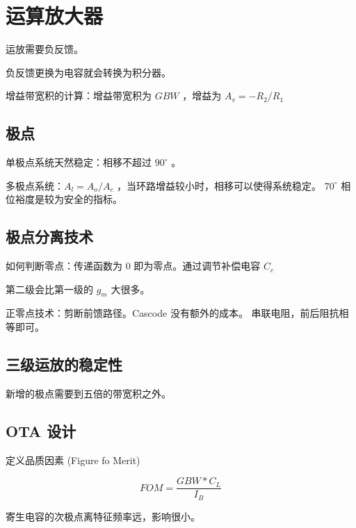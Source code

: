 \documentclass[cn,11pt,chinese,black,simple]{../elegantbook}
\begin{document}
\fi 
\def\chapname{05oa}

\chapter{运算放大器}

运放需要负反馈。

负反馈更换为电容就会转换为积分器。

增益带宽积的计算：增益带宽积为 \(GBW\) ，增益为 \(A_v = - R_2/R_1\) 


\section{极点}

单极点系统天然稳定：相移不超过 \(90 ^\circ\) 。
 
多极点系统：\(A_l = A_o / A_c\) ，当环路增益较小时，相移可以使得系统稳定。 \(70^\circ\) 相位裕度是较为安全的指标。  

\section{极点分离技术}

如何判断零点：传递函数为 0 即为零点。通过调节补偿电容 \(C_{c}\) 

第二级会比第一级的 \(g_m\) 大很多。

正零点技术：剪断前馈路径。Cascode 没有额外的成本。 串联电阻，前后阻抗相等即可。

\section{三级运放的稳定性}

新增的极点需要到五倍的带宽积之外。

\section{OTA 设计}

定义品质因素 (Figure fo Merit) 

\[FOM = \frac{GBW * C_L}{I_B}\]

寄生电容的次极点离特征频率远，影响很小。

\let\chapname\undefined
\ifx\mainclass\undefined
\end{document}
